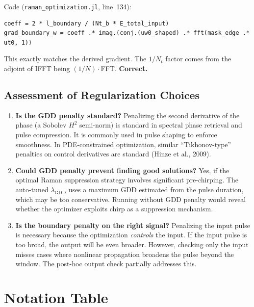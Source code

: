 \documentclass[12pt,a4paper]{article}
\theoremstyle{definition}
\begin{document}
\begin{verified}
Code (\texttt{raman\_optimization.jl}, line~134):
\begin{lstlisting}
coeff = 2 * l_boundary / (Nt_b * E_total_input)
grad_boundary_w = coeff .* imag.(conj.(uw0_shaped) .* fft(mask_edge .* ut0, 1))
\end{lstlisting}
This exactly matches the derived gradient. The $1/N_t$ factor comes from the adjoint of IFFT being $(1/N)\cdot$FFT. \textbf{Correct.}
\end{verified}

\subsection{Assessment of Regularization Choices}

\begin{enumerate}[leftmargin=*]
\item \textbf{Is the GDD penalty standard?} Penalizing the second derivative of the phase (a Sobolev $H^2$ semi-norm) is standard in spectral phase retrieval and pulse compression. It is commonly used in pulse shaping to enforce smoothness. In PDE-constrained optimization, similar ``Tikhonov-type'' penalties on control derivatives are standard (Hinze et al., 2009).

\item \textbf{Could GDD penalty prevent finding good solutions?} Yes, if the optimal Raman suppression strategy involves significant pre-chirping. The auto-tuned $\lambda_{\text{GDD}}$ uses a maximum GDD estimated from the pulse duration, which may be too conservative. Running without GDD penalty would reveal whether the optimizer exploits chirp as a suppression mechanism.

\item \textbf{Is the boundary penalty on the right signal?} Penalizing the input pulse is necessary because the optimization \emph{controls} the input. If the input pulse is too broad, the output will be even broader. However, checking only the input misses cases where nonlinear propagation broadens the pulse beyond the window. The post-hoc output check partially addresses this.
\end{enumerate}



\appendix

\section{Notation Table}
\label{app:notation}
\end{document}
